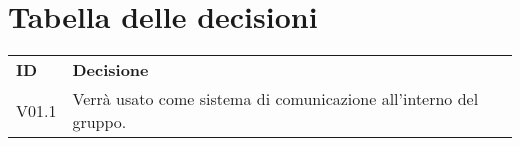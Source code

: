 \documentclass[]{article}
\begin{document}
	\newpage
	
	\section{Tabella delle decisioni}
	
	\begin{table} [h!]
		\begin{center}
			\begin{tabular} { m{2cm} m{14cm} }
				\rowcolor{lightgray}
				\textbf{ID} & \textbf{Decisione}\\
				V01.1 & Verrà usato \glock{Discord} come sistema di comunicazione all'interno del gruppo.
			\end{tabular}
		\end{center}
	\end{table}
\end{document}
